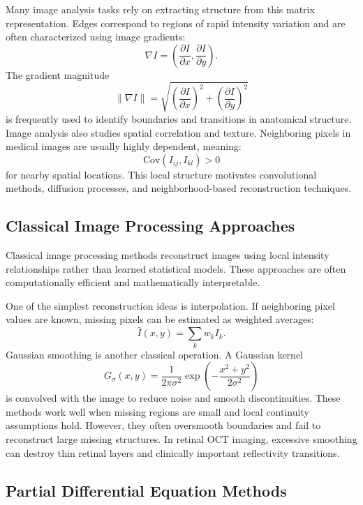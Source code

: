 \documentclass[12pt,oneside]{article}
\newcommand{\Cov}{\mathrm{Cov}}
\begin{document}
Many image analysis tasks rely on extracting structure from this matrix representation. Edges correspond to regions of rapid intensity variation and are often characterized using image gradients:
\[
\nabla I =
\left(
\frac{\partial I}{\partial x},
\frac{\partial I}{\partial y}
\right).
\]
The gradient magnitude
\[
\|\nabla I\|
=
\sqrt{
\left(
\frac{\partial I}{\partial x}
\right)^2
+
\left(
\frac{\partial I}{\partial y}
\right)^2
}
\]
is frequently used to identify boundaries and transitions in anatomical structure.
Image analysis also studies spatial correlation and texture. Neighboring pixels in medical images are usually highly dependent, meaning:
\[
\Cov(I_{ij}, I_{kl}) > 0
\]
for nearby spatial locations. This local structure motivates convolutional methods, diffusion processes, and neighborhood-based reconstruction techniques.

\subsection*{Classical Image Processing Approaches}

Classical image processing methods reconstruct images using local intensity relationships rather than learned statistical models. These approaches are often computationally efficient and mathematically interpretable.

One of the simplest reconstruction ideas is interpolation. If neighboring pixel values are known, missing pixels can be estimated as weighted averages:
\[
\hat{I}(x,y)
=
\sum_k w_k I_k.
\]
Gaussian smoothing is another classical operation. A Gaussian kernel
\[
G_\sigma(x,y)
=
\frac{1}{2\pi\sigma^2}
\exp
\left(
-\frac{x^2+y^2}{2\sigma^2}
\right)
\]
is convolved with the image to reduce noise and smooth discontinuities.
These methods work well when missing regions are small and local continuity assumptions hold. However, they often oversmooth boundaries and fail to reconstruct large missing structures. In retinal OCT imaging, excessive smoothing can destroy thin retinal layers and clinically important reflectivity transitions.

\subsection*{Partial Differential Equation Methods}
\end{document}
